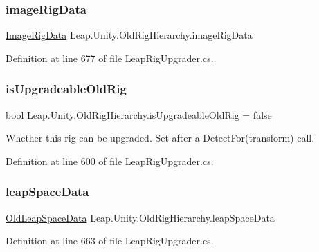 \subsubsection{\texorpdfstring{imageRigData}{imageRigData}}
{\footnotesize\ttfamily \mbox{\hyperlink{class_leap_1_1_unity_1_1_old_rig_hierarchy_1_1_image_rig_data}{Image\+Rig\+Data}} Leap.\+Unity.\+Old\+Rig\+Hierarchy.\+image\+Rig\+Data}



Definition at line 677 of file Leap\+Rig\+Upgrader.\+cs.

\mbox{\label{class_leap_1_1_unity_1_1_old_rig_hierarchy_a87664484cd178765c4ee65191b04fbb9}} 
\subsubsection{\texorpdfstring{isUpgradeableOldRig}{isUpgradeableOldRig}}
{\footnotesize\ttfamily bool Leap.\+Unity.\+Old\+Rig\+Hierarchy.\+is\+Upgradeable\+Old\+Rig = false}



Whether this rig can be upgraded. Set after a Detect\+For(transform) call. 



Definition at line 600 of file Leap\+Rig\+Upgrader.\+cs.

\mbox{\label{class_leap_1_1_unity_1_1_old_rig_hierarchy_ac0517cc34c4970352fd9c8d0b8e903dd}} 
\subsubsection{\texorpdfstring{leapSpaceData}{leapSpaceData}}
{\footnotesize\ttfamily \mbox{\hyperlink{class_leap_1_1_unity_1_1_old_rig_hierarchy_1_1_old_leap_space_data}{Old\+Leap\+Space\+Data}} Leap.\+Unity.\+Old\+Rig\+Hierarchy.\+leap\+Space\+Data}



Definition at line 663 of file Leap\+Rig\+Upgrader.\+cs.

